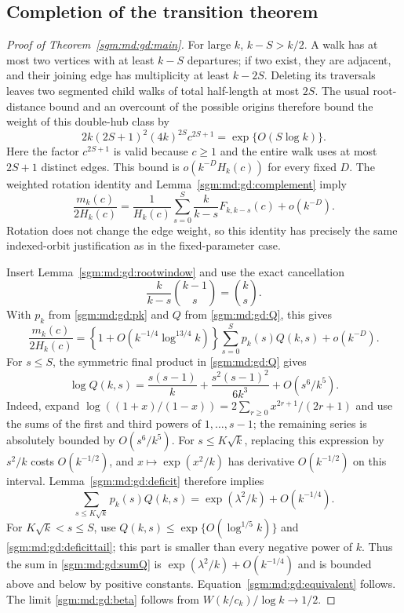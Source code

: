 \documentclass[11pt,letterpaper]{article}
\theoremstyle{remark}\newtheorem{remark}[theorem]{Remark}
\theoremstyle{definition}\newtheorem{definition}[theorem]{Definition}
\begin{document}
\subsection{Completion of the transition theorem}

\begin{proof}[Proof of Theorem~\ref{sgm:md:gd:main}]
For large $k$, $k-S>k/2$.  A walk has at most two vertices with at
least $k-S$ departures; if two exist, they are adjacent, and their
joining edge has multiplicity at least $k-2S$.  Deleting its traversals
leaves two segmented child walks of total half-length at most $2S$.
The usual root-distance bound and an overcount of the possible origins
therefore bound the weight of this double-hub class by
\[
 2k(2S+1)^2(4k)^{2S}c^{2S+1}
 =\exp\{O(S\log k)\}.
\]
Here the factor $c^{2S+1}$ is valid because $c\ge1$ and the entire
walk uses at most $2S+1$ distinct edges.  This bound is
$o(k^{-D}H_k(c))$ for every fixed $D$.
The weighted rotation identity and Lemma~\ref{sgm:md:gd:complement} imply
\begin{equation}\label{sgm:md:gd:rotationreduction}
 \frac{m_k(c)}{2H_k(c)}
 =\frac1{H_k(c)}\sum_{s=0}^S\frac{k}{k-s}F_{k,k-s}(c)
   +o(k^{-D}).
\end{equation}
Rotation does not change the edge weight, so this identity has precisely
the same indexed-orbit justification as in the fixed-parameter case.

Insert Lemma~\ref{sgm:md:gd:rootwindow} and use the exact cancellation
\[
 \frac{k}{k-s}\binom{k-1}{s}=\binom{k}{s}.
\]
With $p_k$ from \eqref{sgm:md:gd:pk} and $Q$ from \eqref{sgm:md:gd:Q}, this gives
\begin{equation}\label{sgm:md:gd:sumQ}
 \frac{m_k(c)}{2H_k(c)}
 =\left\{1+O(k^{-1/4}\log^{13/4}k)\right\}
   \sum_{s=0}^S p_k(s)Q(k,s)+o(k^{-D}).
\end{equation}
For $s\le S$, the symmetric final product in \eqref{sgm:md:gd:Q} gives
\begin{equation}\label{sgm:md:gd:Qasymptotic}
 \log Q(k,s)
 =\frac{s(s-1)}k+
   \frac{s^2(s-1)^2}{6k^3}+O(s^6/k^5).
\end{equation}
Indeed, expand $\log((1+x)/(1-x))=2\sum_{r\ge0}x^{2r+1}/(2r+1)$
and use the sums of the first and third powers of $1,\ldots,s-1$;
the remaining series is absolutely bounded by $O(s^6/k^5)$.
For $s\le K\sqrt{k}$, replacing this expression by $s^2/k$ costs
$O(k^{-1/2})$, and
$x\mapsto\exp(x^2/k)$ has derivative $O(k^{-1/2})$ on this interval.
Lemma~\ref{sgm:md:gd:deficit} therefore implies
\[
 \sum_{s\le K\sqrt{k}}p_k(s)Q(k,s)
 =\exp(\lambda^2/k)+O(k^{-1/4}).
\]
For $K\sqrt{k}<s\le S$, use
$Q(k,s)\le\exp\{O(\log^{1/5}k)\}$ and
\eqref{sgm:md:gd:deficittail}; this part is smaller than every negative
power of $k$.  Thus the sum in \eqref{sgm:md:gd:sumQ} is
$\exp(\lambda^2/k)+O(k^{-1/4})$ and is bounded above and below by
positive constants.  Equation~\eqref{sgm:md:gd:equivalent} follows.
The limit \eqref{sgm:md:gd:beta} follows from
$W(k/c_k)/\log k\to1/2$.
\end{proof}
\end{document}
